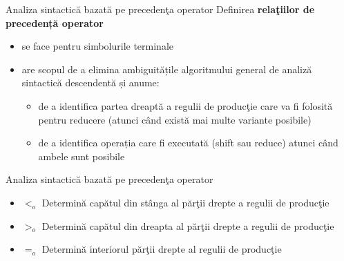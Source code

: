 \documentclass[pdf]{beamer}
\begin{document}
\begin{frame}{Analiza sintactică bazată pe precedenţa operator}
Definirea \textbf{relaţiilor de precedență operator}
\begin{itemize}
\item
se face pentru simbolurile terminale
\item
are scopul de a elimina ambiguitățile algoritmului general de analiză sintactică descendentă și anume:
\begin{itemize}
\item
de a identifica partea dreaptă a regulii de producţie care va fi folosită pentru reducere (atunci când există mai multe variante posibile)
\item
de a identifica operația care fi executată (shift sau reduce) atunci când ambele sunt posibile
\end{itemize}
\end{itemize}
\end{frame}



\begin{frame}{Analiza sintactică bazată pe precedenţa operator}
\begin{itemize}
\item
$<_o$ Determină capătul din stânga al părţii drepte a regulii de producţie
\item
$>_o$  Determină capătul din dreapta al părţii drepte a regulii de producţie
\item
$=_o$ Determină interiorul părţii drepte al regulii de producţie
\end{itemize}
\end{frame}



%
%
%
%
%
\end{document}
